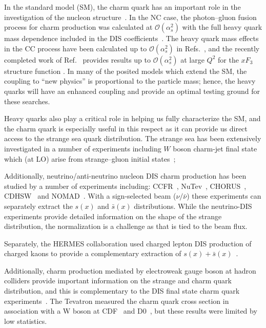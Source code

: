 \documentclass[pdftex,twocolumn,epjc3]{svjour3}          %
\begin{document}
In the standard model (SM), the charm quark has an important role in the
investigation of the nucleon structure~\cite{Behnke:2015qja,Zenaiev:2016kfl,Abdolmaleki:2017wlg}.
%
In the NC case, the photon--gluon fusion process for charm production was
calculated at ${\mathcal{O}}(\alpha_s^2)$ with the full heavy quark mass dependence
included in the DIS coefficients~\cite{Laenen:1992zk,Laenen:1992xs}.
%
The heavy quark mass
effects in the CC process have been  calculated up to
${\mathcal{O}}(\alpha_s^2)$ in
Refs.~\cite{Gottschalk:1980rv,Gluck:1997sj,Blumlein:2011zu,Alekhin:2014sya}, 
and the recently completed work of Ref.~\cite{Berger:2016inr} provides results 
up to ${\mathcal{O}}(\alpha_s^2)$ at large $Q^2$ for the
$xF_3$ structure function \cite{Behring:2015roa}.
%
%
In many of the posited models which extend the SM, the coupling to
``new physics'' is proportional to the particle mass; hence, the heavy
quarks will have an enhanced coupling and provide an optimal testing
ground for these searches.

Heavy quarks also play a critical role in helping us fully
characterize the SM, and the charm quark is especially useful in this
respect as it can provide us direct access to the strange sea quark
distribution.
%
The strange sea has been extensively investigated in a number of
experiments including $W$ boson charm-jet final state which (at LO)
arise from strange--gluon initial states~\cite{Abazov:2014fka,
  Lai:2007dq};
%

Additionally, neutrino/anti-neutrino nucleon DIS charm production has
been studied by a number of experiments including:
%
 CCFR~\cite{Seligman:1997mc},
 NuTev~\cite{Tzanov:2005kr},
 CHORUS~\cite{Onengut:2005kv},
 CDHSW~\cite{Berge:1989hr}
 and
 NOMAD~\cite{Samoylov:2013xoa}.
%
With a sign-selected beam ($\nu/\bar{\nu}$) these experiments can
separately extract the $s(x)$ and $\bar{s}(x)$ distributions. While
the neutrino-DIS experiments provide detailed information on the shape
of the strange distribution, the normalization is a challenge as that
is tied to the beam flux.

Separately, the HERMES collaboration used charged lepton DIS
production of charged kaons to provide a complementary extraction of
$s(x)+ \bar{s}(x)$~\cite{Airapetian:2008qf}.



Additionally,  charm production mediated by electroweak gauge
boson at hadron colliders provide important information on the strange and
charm quark distribution, and this is complementary to the DIS final state charm
quark experiments~\cite{Lai:2007dq}.
%
The Tevatron  measured the charm quark cross
section in association with  a W boson
at CDF~\cite{Aaltonen:2007dm}  and D0~\cite{Abazov:2008qz}, 
but these results were  limited by low statistics.
\end{document}
